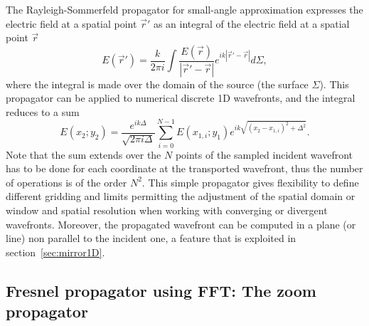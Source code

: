\documentclass{iopconfser}
\begin{document}
The Rayleigh-Sommerfeld propagator for small-angle approximation expresses the electric field at a spatial point $\vec{r}'$ as an integral of the electric field at a spatial point $\vec{r}$ \cite{goodmanfourier}
\begin{equation}\label{eq:RSpropagator}
E(\vec{r}') =  \frac{k}{2 \pi i} \int \frac{E(\vec{r})}{|\vec{r}'-\vec{r}|} e^{ i k |\vec{r}' - \vec{r}|  }  d\Sigma,
\end{equation}
where the integral is made over the domain of the source (the surface $\Sigma$). 
This propagator can be applied to numerical discrete 1D wavefronts, and the integral reduces to a sum
\begin{equation}\label{eq:discreteRSpropagator}
E(x_2;y_2) = \frac{e^{i k \Delta}}{\sqrt{2 \pi i \Delta}}  \sum_{i=0}^{N-1}  E(x_{1,i};y_1) e^{i k \sqrt{(x_2 - x_{1,i})^2 + \Delta^2} }.
\end{equation}
Note that the sum extends over the $N$ points of the sampled incident wavefront has to be done for each coordinate at the transported wavefront, thus the number of operations is of the order $N^2$. This simple propagator gives flexibility to define different gridding and limits permitting the adjustment of the spatial domain or window and spatial resolution when working with converging or divergent wavefronts. Moreover, the propagated wavefront can be computed in a plane (or line) non parallel to the incident one, a feature that is exploited in section~\ref{sec:mirror1D}.


\subsection{Fresnel propagator using FFT: The zoom propagator}
\label{sec:zoomPropagator}
\end{document}
